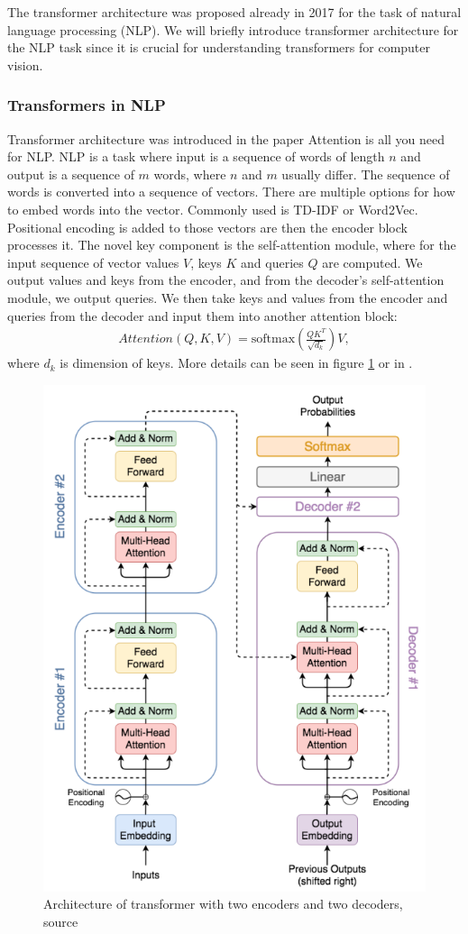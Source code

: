 The transformer architecture was proposed already in 2017 for the task of natural language processing (NLP). We will briefly introduce transformer architecture for the NLP task since it is crucial for understanding transformers for computer vision.

\subsubsection{Transformers in NLP}
Transformer architecture was introduced in the paper Attention is all you need \cite{Vaswani2017} for NLP. NLP is a task where input is a sequence of words of length $n$ and output is a sequence of $m$ words, where $n$ and $m$ usually differ. The sequence of words is converted into a sequence of vectors. There are multiple options for how to embed words into the vector. Commonly used is TD-IDF or Word2Vec\cite{Li2018}. Positional encoding is added to those vectors are then the encoder block processes it. The novel key component is the self-attention module, where for the input sequence of vector values $V$, keys $K$ and queries $Q$ are computed. We output values and keys from the encoder, and from the decoder's self-attention module, we output queries. We then take keys and values from the encoder and queries from the decoder and input them into another attention block:
\begin{align}
    Attention \left(Q,K,V \right) = \text{softmax} \left( \frac{QK^T}{\sqrt{d_k}} \right)V,
\end{align}
where $d_k$ is dimension of keys. More details can be seen in figure \ref{fig:nlp_transformer} or in \cite{Vaswani2017}.

\begin{figure}
    \centering
    \includegraphics[width=0.5\linewidth]{images/two_layer_transformer.png}
    \caption{Architecture of transformer with two encoders and two decoders, source \cite{Yin2020}}
    \label{fig:nlp_transformer}
\end{figure}

